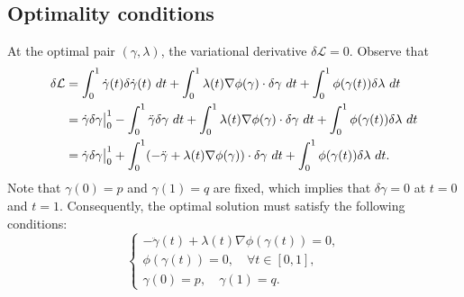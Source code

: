 \documentclass[12pt]{amsart}
\theoremstyle{definition}
\theoremstyle{remark}
\numberwithin{equation}{section}
\numberwithin{equation}{section}
\begin{document}
\subsection{Optimality  conditions}

At the optimal pair $(\gamma,\lambda)$, the variational derivative $\delta \mathcal{L} = 0$. Observe that 
\begin{align*}
    \delta \mathcal{L} & = \int_0^1 \dot{\gamma}(t)\delta\dot{\gamma}(t)~dt + \int_0^1\lambda(t) \nabla\phi(\gamma)\cdot \delta\gamma ~dt + \int_0^1 \phi(\gamma(t))\delta\lambda~dt\\
    & = \dot{\gamma}\delta\gamma\big{\rvert}_0^1 - \int_0^1 \ddot{\gamma}\delta\gamma~dt+\int_0^1\lambda(t) \nabla \phi(\gamma) \cdot \delta\gamma~dt +  \int_0^1 \phi(\gamma(t)) \delta\lambda~dt\\
    & = \dot{\gamma}\delta\gamma\big{\rvert}_0^1+\int_0^1(-\ddot{\gamma}+\lambda(t)\nabla\phi(\gamma))\cdot \delta\gamma~dt +  \int_0^1 \phi(\gamma(t))\delta\lambda~dt.
\end{align*}
Note that $\gamma(0)=p$ and $\gamma(1)=q$ are fixed, which implies that $\delta \gamma=0$ at $t=0$ and $t=1$. Consequently, the optimal solution must satisfy the following conditions: 
\[\begin{cases}
    -\ddot{\gamma}(t)+\lambda(t)\nabla\phi(\gamma(t)) = 0,\\
    \phi(\gamma(t)) = 0,\quad  \forall t\in [0,1],\\
    \gamma(0) = p,\quad 
    \gamma(1) = q.
\end{cases}\]
\end{document}

